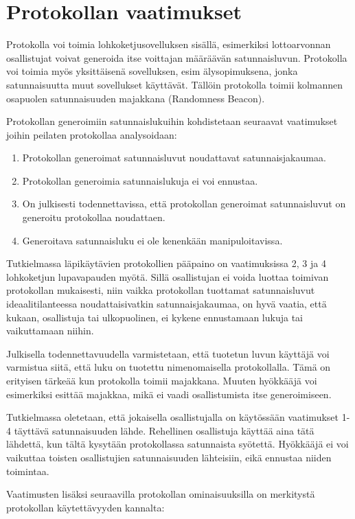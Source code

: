 \section{Protokollan vaatimukset}

Protokolla voi toimia lohkoketjusovelluksen sisällä, esimerkiksi lottoarvonnan osallistujat voivat generoida itse voittajan määräävän satunnaisluvun. Protokolla voi toimia myös yksittäisenä sovelluksen, esim älysopimuksena, jonka satunnaisuutta muut sovellukset käyttävät. Tällöin protokolla toimii kolmannen osapuolen satunnaisuuden majakkana (Randomness Beacon).

Protokollan generoimiin satunnaislukuihin kohdistetaan seuraavat vaatimukset joihin peilaten protokollaa analysoidaan:
\begin{enumerate}
    \item Protokollan generoimat satunnaisluvut noudattavat satunnaisjakaumaa.
    \item Protokollan generoimia satunnaislukuja ei voi ennustaa.
    \item On julkisesti todennettavissa, että protokollan generoimat satunnaisluvut on generoitu protokollaa noudattaen.
    \item Generoitava satunnaisluku ei ole kenenkään manipuloitavissa.
\end{enumerate}

Tutkielmassa läpikäytävien protokollien pääpaino on vaatimuksissa 2, 3 ja 4 lohkoketjun lupavapauden myötä. 
Sillä osallistujan ei voida luottaa toimivan protokollan mukaisesti, niin vaikka protokollan tuottamat satunnaisluvut ideaalitilanteessa noudattaisivatkin satunnaisjakaumaa, on hyvä vaatia, että kukaan, osallistuja tai ulkopuolinen, ei kykene ennustamaan lukuja tai vaikuttamaan niihin.

Julkisella todennettavuudella varmistetaan, että tuotetun luvun käyttäjä voi varmistua siitä, että luku on tuotettu nimenomaisella protokollalla. Tämä on erityisen tärkeää kun protokolla toimii majakkana. Muuten hyökkääjä voi esimerkiksi esittää majakkaa, mikä ei vaadi osallistumista itse generoimiseen.

Tutkielmassa oletetaan, että jokaisella osallistujalla on käytössään vaatimukset 1-4 täyttävä satunnaisuuden lähde. Rehellinen osallistuja käyttää aina tätä lähdettä, kun tältä kysytään protokollassa satunnaista syötettä. Hyökkääjä ei voi vaikuttaa toisten osallistujien satunnaisuuden lähteisiin, eikä ennustaa niiden toimintaa.

Vaatimusten lisäksi seuraavilla protokollan ominaisuuksilla on merkitystä protokollan käytettävyyden kannalta:

